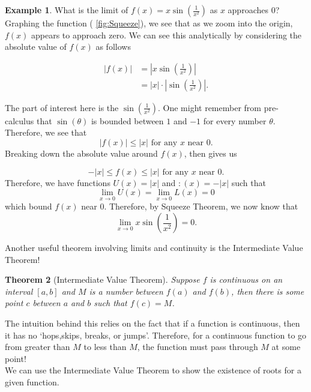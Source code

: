 \documentclass[12pt]{article}
\newcommand{\abs}[1]{ \left| #1 \right| }
\newtheorem{thm}{Theorem}[section]
\theoremstyle{definition}
\newtheorem{exmp}[thm]{Example}
\theoremstyle{plain}
\numberwithin{equation}{section}
\begin{document}
\begin{exmp}
  What is the limit of $f(x)=x\sin\left(\frac{1}{x^2}\right)$ as $x$ approaches 0?\\

  Graphing the function ( \cref{fig:Squeeze}), we see that as we zoom into the origin, $f(x)$ appears to approach zero. We can see this analytically by considering the absolute value of $f(x)$ as follows

  \begin{align}
    \abs{f(x)}&=\abs{x\sin\left(\frac{1}{x^2}\right) }\\
    &= \abs{x}\cdot\abs{\sin\left(\frac{1}{x^2}\right) }.
  \end{align}

The part of interest here is the $\sin\left(\frac{1}{x^2}\right)$. One might remember from pre-calculus that $\sin(\theta)$ is bounded between $1$ and $-1$ for every number $\theta$. Therefore, we see that
\[
\abs{f(x)}\leq \abs{x}\text{ for any }x \text{ near }0.
\]
Breaking down the absolute value around $f(x)$, then gives us

\[
-\abs{x}\leq f(x)\leq \abs{x}\text{ for any }x \text{ near }0.
\]
Therefore, we have functions $U(x)=\abs{x}$ and $:(x)=-\abs{x}$ such that
\[
\lim\limits_{x\to 0} U(x)=\lim\limits_{x\to 0} L(x)= 0
\]
which bound $f(x)$ near 0. Therefore, by Squeeze Theorem, we now know that
\[
\lim\limits_{x\to 0}x\sin\left(\frac{1}{x^2}\right)=0.
\]
\end{exmp}

Another useful theorem involving limits and continuity is the Intermediate Value Theorem!

\begin{thm}[Intermediate Value Theorem]
  Suppose $f$ is continuous on an interval $[a,b]$ and $M$ is a number between $f(a)$ and $f(b)$, then there is some point $c$ between $a$ and $b$ such that $f(c)=M$.
\end{thm}
The intuition behind this relies on the fact that if a function is continuous, then it has no `hops,skips, breaks, or jumps'. Therefore, for a continuous function to go from greater than $M$ to less than $M$, the function must pass through $M$ at some point!\\

We can use the Intermediate Value Theorem to show the existence of roots for a given function.
\end{document}
